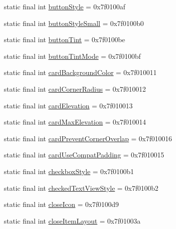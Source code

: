 \begin{CompactItemize}
\item 
static final int \hyperlink{classandroid_1_1support_1_1coreutils_1_1_r_1_1attr_6a701227b18284448aec8cb9fbe6ae6d}{buttonStyle} = 0x7f0100af
\item 
static final int \hyperlink{classandroid_1_1support_1_1coreutils_1_1_r_1_1attr_e39347a65a17c2c64c33ec0c06d8c9d6}{buttonStyleSmall} = 0x7f0100b0
\item 
static final int \hyperlink{classandroid_1_1support_1_1coreutils_1_1_r_1_1attr_eed910df109a8ad9fde9b3970e484186}{buttonTint} = 0x7f0100be
\item 
static final int \hyperlink{classandroid_1_1support_1_1coreutils_1_1_r_1_1attr_32515bd82467fcdacafd5883f5f8548b}{buttonTintMode} = 0x7f0100bf
\item 
static final int \hyperlink{classandroid_1_1support_1_1coreutils_1_1_r_1_1attr_03d6cde875fa875d4e8f29c8b58b12d2}{cardBackgroundColor} = 0x7f010011
\item 
static final int \hyperlink{classandroid_1_1support_1_1coreutils_1_1_r_1_1attr_e229419d3dd0cd028285444a3c8a1428}{cardCornerRadius} = 0x7f010012
\item 
static final int \hyperlink{classandroid_1_1support_1_1coreutils_1_1_r_1_1attr_211a0269919c0dfd6afbc9f5218b7402}{cardElevation} = 0x7f010013
\item 
static final int \hyperlink{classandroid_1_1support_1_1coreutils_1_1_r_1_1attr_d51a49c803514767a1dbc3c841dfa465}{cardMaxElevation} = 0x7f010014
\item 
static final int \hyperlink{classandroid_1_1support_1_1coreutils_1_1_r_1_1attr_69720b86801f3f34eaacda19c18b750b}{cardPreventCornerOverlap} = 0x7f010016
\item 
static final int \hyperlink{classandroid_1_1support_1_1coreutils_1_1_r_1_1attr_8f10769a8480dafaf132424a632e8d44}{cardUseCompatPadding} = 0x7f010015
\item 
static final int \hyperlink{classandroid_1_1support_1_1coreutils_1_1_r_1_1attr_06b22fe8ceee4c9cfdcb61b34ed41bf1}{checkboxStyle} = 0x7f0100b1
\item 
static final int \hyperlink{classandroid_1_1support_1_1coreutils_1_1_r_1_1attr_0b3706214e03da525cbdf782a82cf11c}{checkedTextViewStyle} = 0x7f0100b2
\item 
static final int \hyperlink{classandroid_1_1support_1_1coreutils_1_1_r_1_1attr_bbbe5cab05b584404c42240de629f04d}{closeIcon} = 0x7f0100d9
\item 
static final int \hyperlink{classandroid_1_1support_1_1coreutils_1_1_r_1_1attr_4a20cb3e847b0301947a122149b75bfa}{closeItemLayout} = 0x7f01003a

\end{CompactItemize}
